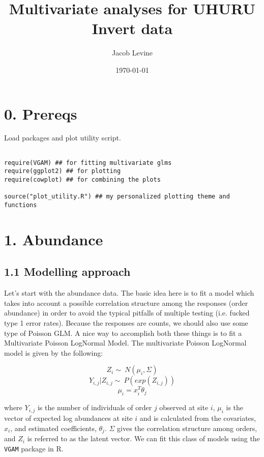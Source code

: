 \documentclass[11pt]{article}
\author{Jacob Levine}
\date{\today}
\title{Multivariate analyses for UHURU Invert data}
\begin{document}
\maketitle
\tableofcontents


\section*{0. Prereqs}
\label{sec:orgf4ef10e}

Load packages and plot utility script.

\begin{verbatim}

require(VGAM) ## for fitting multivariate glms
require(ggplot2) ## for plotting
require(cowplot) ## for combining the plots

source("plot_utility.R") ## my personalized plotting theme and functions

\end{verbatim}


\section*{1. Abundance}
\label{sec:org6ada04b}

\subsection*{1.1 Modelling approach}
\label{sec:org3f0d651}

Let's start with the abundance data. The basic idea here is to fit a model which takes into account a possible correlation structure among the responses (order abundance) in order to avoid the typical pitfalls of multiple testing (i.e. fucked type 1 error rates). Because the responses are counts, we should also use some type of Poisson GLM. A nice way to accomplish both these things is to fit a Multivariate Poisson LogNormal Model. The multivariate Poisson LogNormal model is given by the following:

\begin{equation*}
Z_i \sim\ N(\mu_i, \Sigma)
\end{equation*}
\begin{equation}
Y_{i,j} | Z_{i,j} \sim\ P(exp(Z_{i,j}))
\end{equation}
\begin{equation*}
\mu_i = x_i^T\theta_j
\end{equation*}


where \(Y_{i,j}\) is the number of individuals of order \(j\) observed at site \(i\), \(\mu_i\) is the vector of expected log abundances at site \(i\) and is calculated from the covariates, \(x_i\), and estimated coefficients, \(\theta_j\). \(\Sigma\) gives the correlation structure among orders, and \(Z_i\) is referred to as the latent vector. We can fit this class of models using the \texttt{VGAM} package in R.
\end{document}
